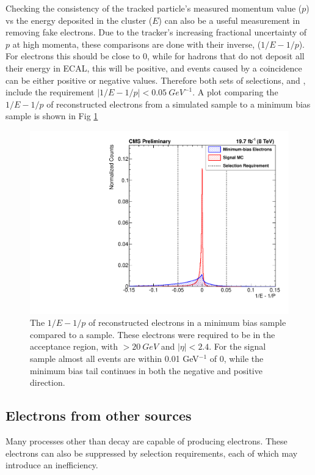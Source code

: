 Checking the consistency of the tracked particle's measured momentum value ($p$) vs the energy deposited in the cluster ($E$) can also be a useful measurement in removing fake electrons. Due to the tracker's increasing fractional uncertainty of $p$ at high momenta, these comparisons are done with their inverse, ($1/E-1/p$). For electrons this should be close to 0, while for hadrons that do not deposit all their energy in ECAL, this will be positive, and events caused by a coincidence can be either positive or negative values. Therefore both sets of selections, \EGTIGHT and \EGMEDIUM, include the requirement  $|1/E-1/p|<\SI{0.05}{GeV}^{-1}$. A plot comparing the $1/E-1/p$ of reconstructed electrons from a \Ztoee simulated sample to a minimum bias sample is shown in Fig \ref{fig:InverseEnMinusInverseMom}

\begin{figure}[!htbp]
    \centering
    \includegraphics[width=\linewidth]{figures/EventSelection/AlexsEventSelectionFigures/e_reco_var_1oe_1op.pdf}
    \caption{The $1/E-1/p$ of reconstructed electrons in a minimum bias sample compared to a \MADGRAPH \Ztoee sample. These electrons were required to be in the acceptance region, with \pt $>\SI{20}{GeV}$ and $|\eta|<2.4$. For the signal sample almost all events are within 0.01 GeV$^{-1}$ of 0, while the minimum bias tail continues in both the negative and positive direction.}
    \label{fig:InverseEnMinusInverseMom}
\end{figure}
\subsection{Electrons from other sources}
Many processes other than \Z decay are capable of producing electrons. These electrons can also be suppressed by selection requirements, each of which may introduce an inefficiency.
